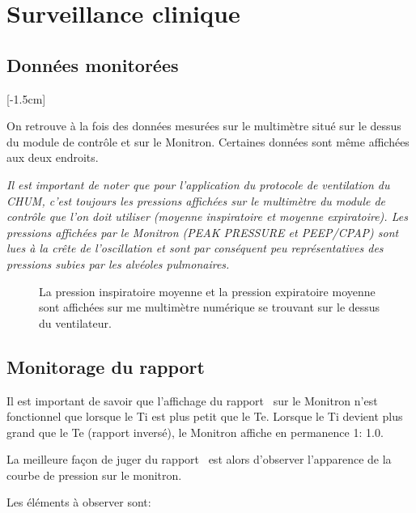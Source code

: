 \chapter{Surveillance clinique}

\section{Données monitorées}
\marginnote{}[-1.5cm]

On retrouve à la fois des données mesurées sur le multimètre situé sur
le dessus du module de contrôle et sur le Monitron. Certaines données
sont même affichées aux deux endroits.

\begin{auchum}
\emph{Il est important de noter que pour l'application du protocole de
ventilation du CHUM, c'est toujours les pressions affichées sur le
multimètre du module de contrôle que l'on doit utiliser (moyenne
inspiratoire et moyenne expiratoire).  Les pressions affichées par le Monitron (PEAK PRESSURE et PEEP/CPAP)
sont lues à la crête de l'oscillation et sont par conséquent peu
représentatives des pressions subies par les alvéoles pulmonaires.
}
\end{auchum}

\begin{figure}
	\begin{wide}
	
	\caption[Pressions affichées sur le multimètre numérique]{La pression inspiratoire moyenne et la pression expiratoire moyenne sont affichées sur me multimètre numérique se trouvant sur le dessus du ventilateur.}
	\end{wide}
\end{figure}

\section{Monitorage du rapport \ie}

Il est important de savoir que l'affichage du rapport \ie\ sur le
Monitron n'est fonctionnel que lorsque le Ti est plus petit que le Te.
Lorsque le Ti devient plus grand que le Te (rapport inversé), le
Monitron affiche en permanence 1\string: 1.0.

La meilleure façon de juger du rapport \ie\ est alors d'observer
l'apparence de la courbe de pression sur le monitron.

Les éléments à observer sont:

